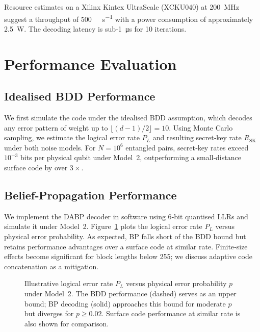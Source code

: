 \documentclass[conference]{IEEEtran}
\begin{document}
Resource estimates on a Xilinx Kintex UltraScale (XCKU040) at \SI{200}{\mega\hertz} suggest a throughput of \SI{500}{\mega\codeword\per\second} with a power consumption of approximately \SI{2.5}{\watt}.  The decoding latency is sub‑\SI{1}{\micro\second} for 10 iterations.

\section{Performance Evaluation}

\subsection{Idealised BDD Performance}
We first simulate the code under the idealised BDD assumption, which decodes any error pattern of weight up to $\lfloor (d-1)/2 \rfloor=10$.  Using Monte Carlo sampling, we estimate the logical error rate $P_L$ and resulting secret‑key rate $R_{\mathrm{SK}}$ under both noise models.  For $N=10^6$ entangled pairs, secret‑key rates exceed $10^{-3}$ bits per physical qubit under Model 2, outperforming a small‑distance surface code by over $3\times$.

\subsection{Belief‑Propagation Performance}
We implement the DABP decoder in software using 6‑bit quantised LLRs and simulate it under Model 2.  Figure \ref{fig:ber} plots the logical error rate $P_L$ versus physical error probability.  As expected, BP falls short of the BDD bound but retains performance advantages over a surface code at similar rate.  Finite‑size effects become significant for block lengths below 255; we discuss adaptive code concatenation as a mitigation.

\begin{figure}[t]
\centering
{}
\caption{Illustrative logical error rate $P_L$ versus physical error probability $p$ under Model 2.  The BDD performance (dashed) serves as an upper bound; BP decoding (solid) approaches this bound for moderate $p$ but diverges for $p\ge0.02$.  Surface code performance at similar rate is also shown for comparison.}
\label{fig:ber}
\end{figure}
\end{document}
